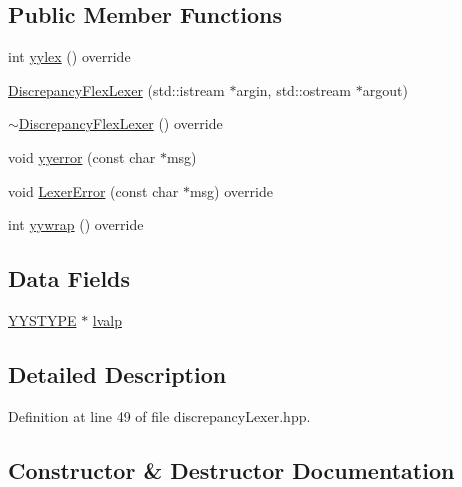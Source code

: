 \subsection*{Public Member Functions}
\begin{DoxyCompactItemize}
\item 
int \hyperlink{structDiscrepancyFlexLexer_a34f5dc468e146d391709f96c0b43e0a7}{yylex} () override
\item 
\hyperlink{structDiscrepancyFlexLexer_ae4c0d14d5332d82179215cb613a32287}{Discrepancy\+Flex\+Lexer} (std\+::istream $\ast$argin, std\+::ostream $\ast$argout)
\item 
\hyperlink{structDiscrepancyFlexLexer_ae76e4e2727ed13d4bbe8dccc034c8ed2}{$\sim$\+Discrepancy\+Flex\+Lexer} () override
\item 
void \hyperlink{structDiscrepancyFlexLexer_a4ae4826544bd976fb06dd16cfd007561}{yyerror} (const char $\ast$msg)
\item 
void \hyperlink{structDiscrepancyFlexLexer_a82526ebd7cb2e0e9d564a850e025b80d}{Lexer\+Error} (const char $\ast$msg) override
\item 
int \hyperlink{structDiscrepancyFlexLexer_a62b685d56c7b7ea966f872bf48f21d9d}{yywrap} () override
\end{DoxyCompactItemize}
\subsection*{Data Fields}
\begin{DoxyCompactItemize}
\item 
\hyperlink{asn__parser_8cpp_a2ceb5b985e149f18e018b142cfdd7264}{Y\+Y\+S\+T\+Y\+PE} $\ast$ \hyperlink{structDiscrepancyFlexLexer_a9cc961a546980b0c59b4074bd9205d00}{lvalp}
\end{DoxyCompactItemize}


\subsection{Detailed Description}


Definition at line 49 of file discrepancy\+Lexer.\+hpp.



\subsection{Constructor \& Destructor Documentation}
\mbox{\label{structDiscrepancyFlexLexer_ae4c0d14d5332d82179215cb613a32287}} 
